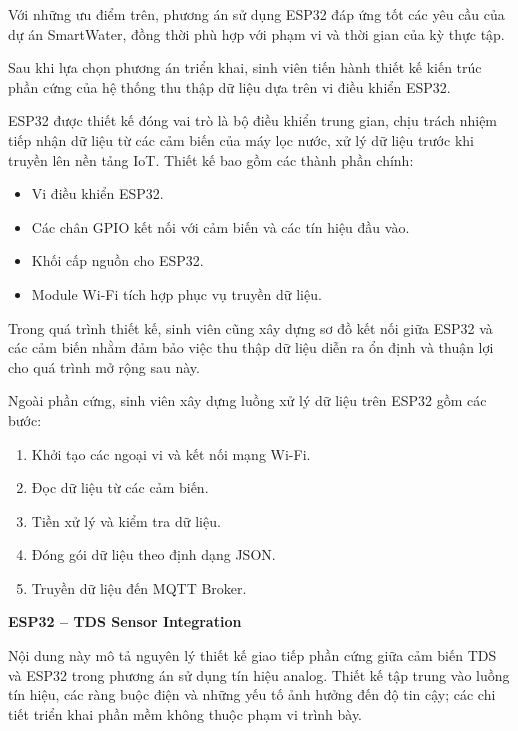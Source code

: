 Với những ưu điểm trên, phương án sử dụng ESP32 đáp ứng tốt các yêu cầu của dự án SmartWater, đồng thời phù hợp với phạm vi và thời gian của kỳ thực tập.

\vspace{0.5em}


Sau khi lựa chọn phương án triển khai, sinh viên tiến hành thiết kế kiến trúc phần cứng của hệ thống thu thập dữ liệu dựa trên vi điều khiển ESP32.

ESP32 được thiết kế đóng vai trò là bộ điều khiển trung gian, chịu trách nhiệm tiếp nhận dữ liệu từ các cảm biến của máy lọc nước, xử lý dữ liệu trước khi truyền lên nền tảng IoT. Thiết kế bao gồm các thành phần chính:

\begin{itemize}
    \item Vi điều khiển ESP32.
    \item Các chân GPIO kết nối với cảm biến và các tín hiệu đầu vào.
    \item Khối cấp nguồn cho ESP32.
    \item Module Wi-Fi tích hợp phục vụ truyền dữ liệu.
\end{itemize}

Trong quá trình thiết kế, sinh viên cũng xây dựng sơ đồ kết nối giữa ESP32 và các cảm biến nhằm đảm bảo việc thu thập dữ liệu diễn ra ổn định và thuận lợi cho quá trình mở rộng sau này.

Ngoài phần cứng, sinh viên xây dựng luồng xử lý dữ liệu trên ESP32 gồm các bước:

\begin{enumerate}
    \item Khởi tạo các ngoại vi và kết nối mạng Wi-Fi.
    \item Đọc dữ liệu từ các cảm biến.
    \item Tiền xử lý và kiểm tra dữ liệu.
    \item Đóng gói dữ liệu theo định dạng JSON.
    \item Truyền dữ liệu đến MQTT Broker.
\end{enumerate}

\vspace{0.5em}


\textbf{ESP32 -- TDS Sensor Integration}

Nội dung này mô tả nguyên lý thiết kế giao tiếp phần cứng giữa cảm biến TDS và ESP32 trong phương án sử dụng tín hiệu analog. Thiết kế tập trung vào luồng tín hiệu, các ràng buộc điện và những yếu tố ảnh hưởng đến độ tin cậy; các chi tiết triển khai phần mềm không thuộc phạm vi trình bày.


